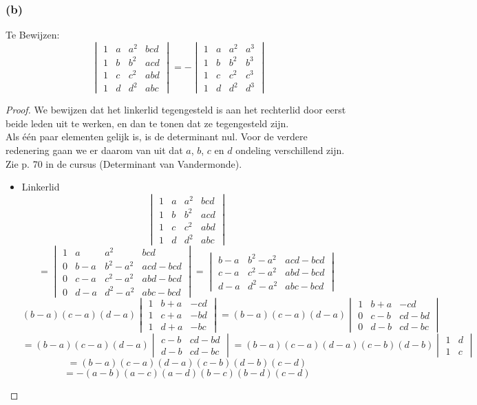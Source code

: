 \documentclass[lineaire_algebra_oplossingen.tex]{subfiles}
\begin{document}
\subsubsection*{(b)}
Te Bewijzen:
\[
\begin{vmatrix}
1 & a & a^2 & bcd\\
1 & b & b^2 & acd\\
1 & c & c^2 & abd\\
1 & d & d^2 & abc
\end{vmatrix}
=
-
\begin{vmatrix}
1 & a & a^2 & a^3\\
1 & b & b^2 & b^3\\
1 & c & c^2 & c^3\\
1 & d & d^2 & d^3
\end{vmatrix}
\]
\begin{proof}
We bewijzen dat het linkerlid tegengesteld is aan het rechterlid door eerst beide leden uit te werken, en dan te tonen dat ze tegengesteld zijn.\\
Als \'e\'en paar elementen gelijk is, is de determinant nul. Voor de verdere redenering gaan we er daarom van uit dat $a$, $b$, $c$ en $d$ ondeling verschillend zijn.
Zie p. 70 in de cursus (Determinant van Vandermonde).
\begin{itemize}
\item Linkerlid
\[
\begin{vmatrix}
1 & a & a^2 & bcd\\
1 & b & b^2 & acd\\
1 & c & c^2 & abd\\
1 & d & d^2 & abc
\end{vmatrix}
\]
\[
=
\begin{vmatrix}
1 & a & a^2 & bcd\\
0 & b-a & b^2-a^2 & acd-bcd\\
0 & c-a & c^2-a^2 & abd-bcd\\
0 & d-a & d^2-a^2 & abc-bcd
\end{vmatrix}
=
\begin{vmatrix}
b-a & b^2-a^2 & acd-bcd\\
c-a & c^2-a^2 & abd-bcd\\
d-a & d^2-a^2 & abc-bcd
\end{vmatrix}
\]
\[
(b-a)(c-a)(d-a)
\begin{vmatrix}
1 & b+a & -cd\\
1 & c+a & -bd\\
1 & d+a & -bc
\end{vmatrix}
=
(b-a)(c-a)(d-a)
\begin{vmatrix}
1 & b+a & -cd\\
0 & c-b & cd-bd\\
0 & d-b & cd-bc
\end{vmatrix}
\]
\[
=
(b-a)(c-a)(d-a)
\begin{vmatrix}
c-b & cd-bd\\
d-b & cd-bc
\end{vmatrix}
=
(b-a)(c-a)(d-a)(c-b)(d-b)
\begin{vmatrix}
1 & d\\
1 & c
\end{vmatrix}
\]
\[
=
(b-a)(c-a)(d-a)(c-b)(d-b)(c-d)
\]
\[
=
-(a-b)(a-c)(a-d)(b-c)(b-d)(c-d)
\]


\end{itemize}
\end{proof}
\end{document}
